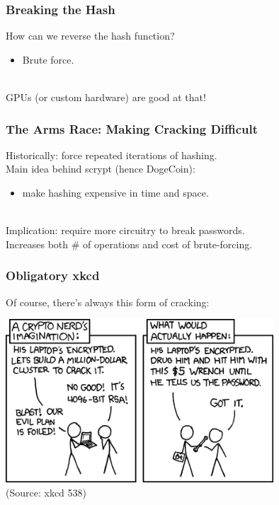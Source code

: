\begin{frame}
  \frametitle{Breaking the Hash}
  
    How can we reverse the hash function?
    \begin{itemize}
    \item    Brute force.
    \end{itemize}~\\
    GPUs (or custom hardware) are good at that!
  
\end{frame}

\begin{frame}
  \frametitle{The Arms Race: Making Cracking Difficult}
  
    Historically: force repeated iterations of hashing.\\[1em]

    Main idea behind scrypt (hence DogeCoin):
    \begin{itemize}
    \item make hashing expensive in time and space.
    \end{itemize}~\\
    Implication: require more circuitry to break passwords.\\
    Increases both \# of operations and cost of brute-forcing.
  
\end{frame}



\begin{frame}
\frametitle{Obligatory xkcd}

Of course, there's always this form of cracking:
\begin{center}
\includegraphics[width=0.75\textwidth]{images/xkcd-538}\\
\hfill (Source: xkcd 538)
\end{center}

\end{frame}


